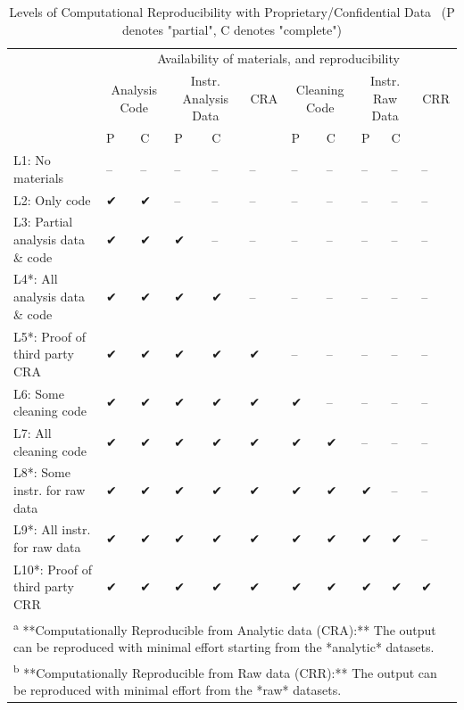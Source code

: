 \documentclass[]{book}
\begin{document}
\begin{table}

\caption{\label{tab:levels-of-computational-reproducibility-adjusted}Levels of Computational Reproducibility with Proprietary/Confidential Data \
 (P denotes "partial", C denotes "complete")}
\centering
\begin{tabular}[t]{l|l|l|l|l|l|l|l|l|l|l}
\hline
\multicolumn{1}{c|}{ } & \multicolumn{10}{c}{Availability of materials, and reproducibility} \\
\cline{2-11}
\multicolumn{1}{c|}{ } & \multicolumn{2}{c|}{Analysis Code} & \multicolumn{2}{c|}{Instr. Analysis Data} & \multicolumn{1}{c|}{CRA} & \multicolumn{2}{c|}{Cleaning Code} & \multicolumn{2}{c|}{Instr. Raw Data} & \multicolumn{1}{c}{CRR} \\
\cline{2-3} \cline{4-5} \cline{6-6} \cline{7-8} \cline{9-10} \cline{11-11}
  & P & C & P & C &   & P & C & P & C &  \\
\hline
L1: No materials & -- & -- & -- & -- & -- & -- & -- & -- & -- & --\\
\hline
L2: Only code & ✔ & ✔ & -- & -- & -- & -- & -- & -- & -- & --\\
\hline
L3: Partial analysis data \& code & ✔ & ✔ & ✔ & -- & -- & -- & -- & -- & -- & --\\
\hline
L4*: All analysis data \& code & ✔ & ✔ & ✔ & ✔ & -- & -- & -- & -- & -- & --\\
\hline
L5*: Proof of third party CRA & ✔ & ✔ & ✔ & ✔ & ✔ & -- & -- & -- & -- & --\\
\hline
L6: Some cleaning code & ✔ & ✔ & ✔ & ✔ & ✔ & ✔ & -- & -- & -- & --\\
\hline
L7: All cleaning code & ✔ & ✔ & ✔ & ✔ & ✔ & ✔ & ✔ & -- & -- & --\\
\hline
L8*: Some instr. for raw data & ✔ & ✔ & ✔ & ✔ & ✔ & ✔ & ✔ & ✔ & -- & --\\
\hline
L9*: All instr. for raw data & ✔ & ✔ & ✔ & ✔ & ✔ & ✔ & ✔ & ✔ & ✔ & --\\
\hline
L10*: Proof of third party CRR & ✔ & ✔ & ✔ & ✔ & ✔ & ✔ & ✔ & ✔ & ✔ & ✔\\
\hline
\multicolumn{11}{l}{\textsuperscript{a} **Computationally Reproducible from Analytic data (CRA):** The output can be reproduced with minimal effort starting from the *analytic* datasets.}\\
\multicolumn{11}{l}{\textsuperscript{b} **Computationally Reproducible from Raw data (CRR):** The output can be reproduced with minimal effort from the *raw* datasets.}\\
\end{tabular}
\end{table}
\end{document}
